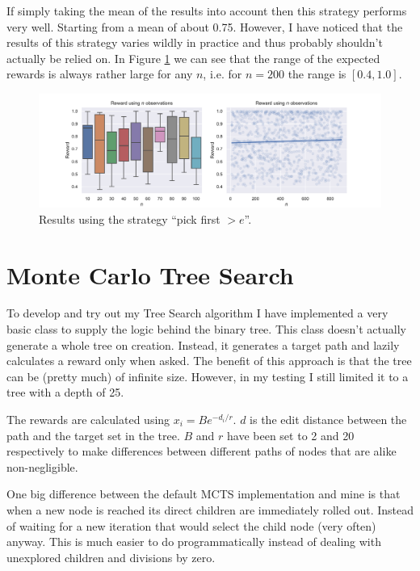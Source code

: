 \documentclass[]{scrartcl}
\begin{document}
If simply taking the mean of the results into account then this strategy performs very well. Starting from a mean of about 0.75. However, I have noticed that the results of this strategy varies wildly in practice and thus probably shouldn't actually be relied on. In Figure \ref{fig:1-3} we can see that the range of the expected rewards is always rather large for any $n$, i.e. for $n=200$ the range is $[0.4, 1.0]$.

\begin{figure}[H]
	\centering
	\includegraphics[width=1\linewidth]{1-3.pdf}
	\caption{Results using the strategy ``pick first $> e$''.}
	\label{fig:1-3}
\end{figure}

\section{Monte Carlo Tree Search}

To develop and try out my Tree Search algorithm I have implemented a very basic class to supply the logic behind the binary tree. This class doesn't actually generate a whole tree on creation. Instead, it generates a target path and lazily calculates a reward only when asked. The benefit of this approach is that the tree can be (pretty much) of infinite size. However, in my testing I still limited it to a tree with a depth of 25.

The rewards are calculated using $x_i = Be^{-d_i/r}$. $d$ is the edit distance between the path and the target set in the tree. $B$ and $r$ have been set to 2 and 20 respectively to make differences between different paths of nodes that are alike non-negligible.

One big difference between the default MCTS implementation and mine is that when a new node is reached its direct children are immediately rolled out. Instead of waiting for a new iteration that would select the child node (very often) anyway. This is much easier to do programmatically instead of dealing with unexplored children and divisions by zero.
\end{document}

